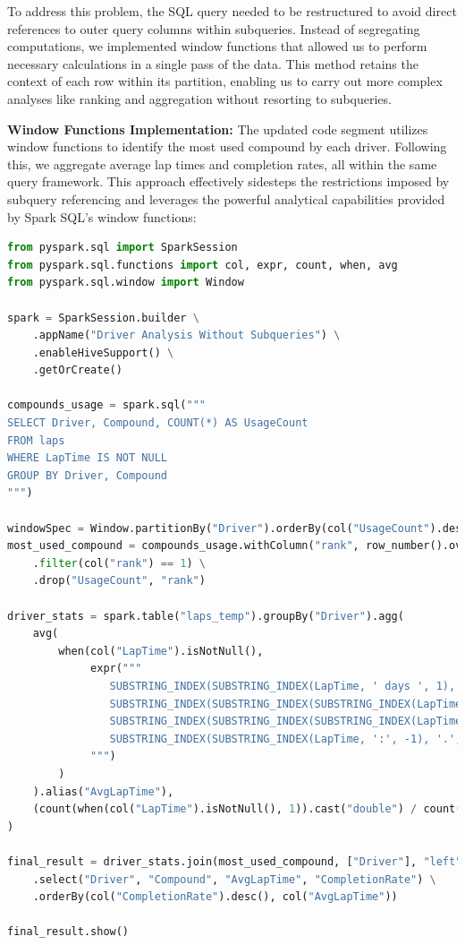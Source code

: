 \documentclass{article}
\begin{document}
To address this problem, the SQL query needed to be restructured to avoid direct references to outer query columns within subqueries. Instead of segregating computations, we implemented window functions that allowed us to perform necessary calculations in a single pass of the data. This method retains the context of each row within its partition, enabling us to carry out more complex analyses like ranking and aggregation without resorting to subqueries.

\textbf{Window Functions Implementation:}
The updated code segment utilizes window functions to identify the most used compound by each driver. Following this, we aggregate average lap times and completion rates, all within the same query framework. This approach effectively sidesteps the restrictions imposed by subquery referencing and leverages the powerful analytical capabilities provided by Spark SQL’s window functions:

\begin{lstlisting}[language=Python]
from pyspark.sql import SparkSession
from pyspark.sql.functions import col, expr, count, when, avg
from pyspark.sql.window import Window

spark = SparkSession.builder \
    .appName("Driver Analysis Without Subqueries") \
    .enableHiveSupport() \
    .getOrCreate()

compounds_usage = spark.sql("""
SELECT Driver, Compound, COUNT(*) AS UsageCount
FROM laps
WHERE LapTime IS NOT NULL
GROUP BY Driver, Compound
""")

windowSpec = Window.partitionBy("Driver").orderBy(col("UsageCount").desc())
most_used_compound = compounds_usage.withColumn("rank", row_number().over(windowSpec)) \
    .filter(col("rank") == 1) \
    .drop("UsageCount", "rank")

driver_stats = spark.table("laps_temp").groupBy("Driver").agg(
    avg(
        when(col("LapTime").isNotNull(),
             expr("""
                SUBSTRING_INDEX(SUBSTRING_INDEX(LapTime, ' days ', 1), ' days ', -1) * 1440 +
                SUBSTRING_INDEX(SUBSTRING_INDEX(SUBSTRING_INDEX(LapTime, ' days ', -1), ':', 1), ' ', -1) * 60 +
                SUBSTRING_INDEX(SUBSTRING_INDEX(SUBSTRING_INDEX(LapTime, ':', 2), ':', -1), ' ', 1) +
                SUBSTRING_INDEX(SUBSTRING_INDEX(LapTime, ':', -1), '.', 1) / 60
             """)
        )
    ).alias("AvgLapTime"),
    (count(when(col("LapTime").isNotNull(), 1)).cast("double") / count("*").cast("double") * 100).alias("CompletionRate")
)

final_result = driver_stats.join(most_used_compound, ["Driver"], "left") \
    .select("Driver", "Compound", "AvgLapTime", "CompletionRate") \
    .orderBy(col("CompletionRate").desc(), col("AvgLapTime"))

final_result.show()
\end{lstlisting}
\end{document}
